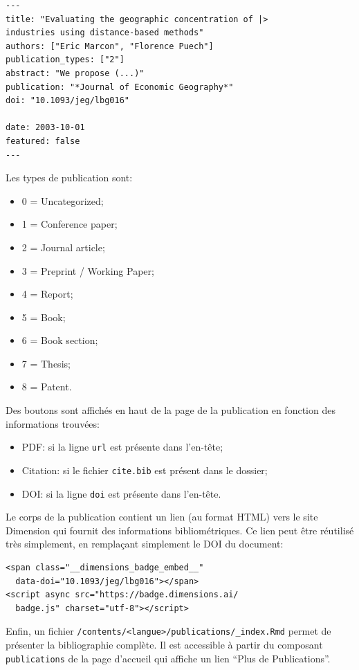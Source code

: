 \documentclass[
  12pt,
  french,
  a4paper,
  extrafontsizes,onecolumn,openright
  ]{memoir}
\providecommand{\tightlist}{%
  \setlength{\itemsep}{0pt}\setlength{\parskip}{0pt}}
\begin{document}
\begin{verbatim}
---
title: "Evaluating the geographic concentration of |>
industries using distance-based methods"
authors: ["Eric Marcon", "Florence Puech"]
publication_types: ["2"]
abstract: "We propose (...)"
publication: "*Journal of Economic Geography*"
doi: "10.1093/jeg/lbg016"

date: 2003-10-01
featured: false
---
\end{verbatim}

Les types de publication sont:

\begin{itemize}
\tightlist
\item
  0 = Uncategorized;
\item
  1 = Conference paper;
\item
  2 = Journal article;
\item
  3 = Preprint / Working Paper;
\item
  4 = Report;
\item
  5 = Book;
\item
  6 = Book section;
\item
  7 = Thesis;
\item
  8 = Patent.
\end{itemize}

Des boutons sont affichés en haut de la page de la publication en fonction des informations trouvées:

\begin{itemize}
\tightlist
\item
  PDF: si la ligne \texttt{url} est présente dans l'en-tête;
\item
  Citation: si le fichier \texttt{cite.bib} est présent dans le dossier;
\item
  DOI: si la ligne \texttt{doi} est présente dans l'en-tête.
\end{itemize}

Le corps de la publication contient un lien (au format HTML) vers le site Dimension qui fournit des informations bibliométriques.
Ce lien peut être réutilisé très simplement, en remplaçant simplement le DOI du document:

\begin{verbatim}
<span class="__dimensions_badge_embed__" 
  data-doi="10.1093/jeg/lbg016"></span>
<script async src="https://badge.dimensions.ai/
  badge.js" charset="utf-8"></script>
\end{verbatim}

Enfin, un fichier \texttt{/contents/\textless{}langue\textgreater{}/publications/\_index.Rmd} permet de présenter la bibliographie complète.
Il est accessible à partir du composant \texttt{publications} de la page d'accueil qui affiche un lien \enquote{Plus de Publications}.
\end{document}
